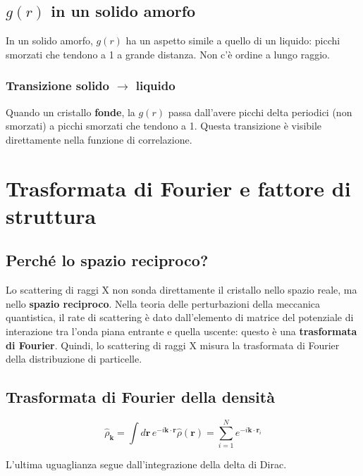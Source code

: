 \subsection{$g(r)$ in un solido amorfo}

In un solido amorfo, $g(r)$ ha un aspetto simile a quello di un liquido: picchi smorzati che tendono a 1 a grande distanza. Non c'è ordine a lungo raggio.

\subsubsection{Transizione solido $\to$ liquido}

Quando un cristallo \textbf{fonde}, la $g(r)$ passa dall'avere picchi delta periodici (non smorzati) a picchi smorzati che tendono a 1. Questa transizione è visibile direttamente nella funzione di correlazione.

\section{Trasformata di Fourier e fattore di struttura}

\subsection*{Perché lo spazio reciproco?}

Lo scattering di raggi X non sonda direttamente il cristallo nello spazio reale, ma nello \textbf{spazio reciproco}. Nella teoria delle perturbazioni della meccanica quantistica, il rate di scattering è dato dall'elemento di matrice del potenziale di interazione tra l'onda piana entrante e quella uscente: questo è una \textbf{trasformata di Fourier}. Quindi, lo scattering di raggi X misura la trasformata di Fourier della distribuzione di particelle.

\subsection*{Trasformata di Fourier della densità}

\begin{equation}
\hat{\rho}_{\mathbf{k}} = \int d\mathbf{r} \, e^{-i\mathbf{k} \cdot \mathbf{r}} \hat{\rho}(\mathbf{r}) = \sum_{i=1}^{N} e^{-i\mathbf{k} \cdot \mathbf{r}_i}
\end{equation}

L'ultima uguaglianza segue dall'integrazione della delta di Dirac.


